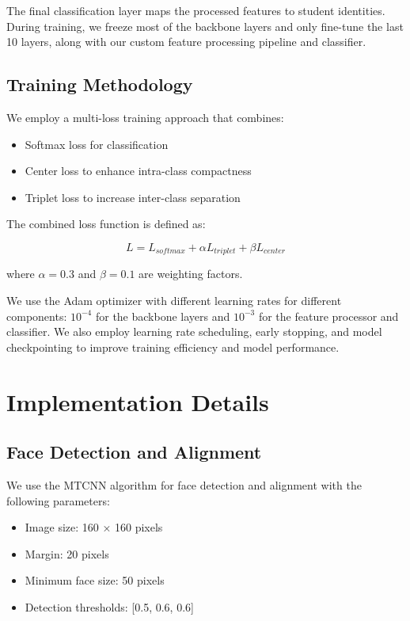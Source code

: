 \documentclass[conference]{IEEEtran}
\begin{document}
The final classification layer maps the processed features to student identities. During training, we freeze most of the backbone layers and only fine-tune the last 10 layers, along with our custom feature processing pipeline and classifier.

\subsection{Training Methodology}
We employ a multi-loss training approach that combines:

\begin{itemize}
\item Softmax loss for classification
\item Center loss to enhance intra-class compactness
\item Triplet loss to increase inter-class separation
\end{itemize}

The combined loss function is defined as:

\begin{equation}
L = L_{softmax} + \alpha L_{triplet} + \beta L_{center}
\end{equation}

where $\alpha = 0.3$ and $\beta = 0.1$ are weighting factors.

We use the Adam optimizer with different learning rates for different components: $10^{-4}$ for the backbone layers and $10^{-3}$ for the feature processor and classifier. We also employ learning rate scheduling, early stopping, and model checkpointing to improve training efficiency and model performance.

\section{Implementation Details}
\subsection{Face Detection and Alignment}
We use the MTCNN algorithm for face detection and alignment with the following parameters:

\begin{itemize}
\item Image size: 160 × 160 pixels
\item Margin: 20 pixels
\item Minimum face size: 50 pixels
\item Detection thresholds: [0.5, 0.6, 0.6]
\end{itemize}
\end{document}
